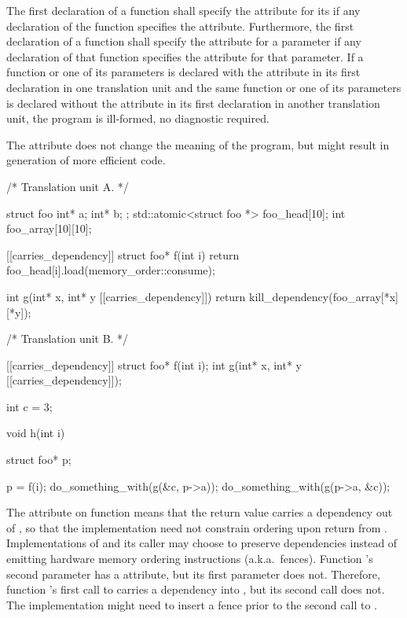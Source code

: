 \pnum
The first declaration of a function shall specify the  attribute for its
 if any declaration of the function specifies the
 attribute. Furthermore, the first declaration of a function shall specify
the  attribute for a parameter if any declaration of that function
specifies the  attribute for that parameter. If a function or one of its
parameters is declared with the  attribute in its first declaration in one
translation unit and the same function or one of its parameters is declared without the
 attribute in its first declaration in another translation unit, the
program is ill-formed, no diagnostic required.

\pnum
\begin{note}
The  attribute does not change the meaning of the
program, but might result in generation of more efficient code.
\end{note}

\pnum
\begin{example}
\begin{codeblock}
/* Translation unit A. */

struct foo { int* a; int* b; };
std::atomic<struct foo *> foo_head[10];
int foo_array[10][10];

[[carries_dependency]] struct foo* f(int i) {
  return foo_head[i].load(memory_order::consume);
}

int g(int* x, int* y [[carries_dependency]]) {
  return kill_dependency(foo_array[*x][*y]);
}

/* Translation unit B. */

[[carries_dependency]] struct foo* f(int i);
int g(int* x, int* y [[carries_dependency]]);

int c = 3;

void h(int i) {
  struct foo* p;

  p = f(i);
  do_something_with(g(&c, p->a));
  do_something_with(g(p->a, &c));
}
\end{codeblock}

The  attribute on function  means that the
return value carries a dependency out of , so that the implementation
need not constrain ordering upon return from . Implementations of
 and its caller may choose to preserve dependencies instead of emitting
hardware memory ordering instructions (a.k.a.\ fences).
Function 's second parameter has a  attribute,
but its first parameter does not. Therefore, function 's first call to
 carries a dependency into , but its second call does not. The
implementation might need to insert a fence prior to the second call to
.
\end{example}
%

